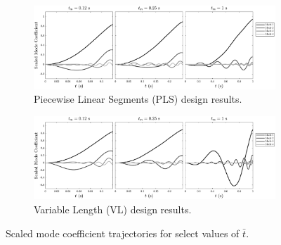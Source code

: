 \begin{figure}[t]
    \centering
    \begin{subfigure}[b]{0.98\textwidth}
      \centering
      \includegraphics[width=\columnwidth]{../ch7/figures/ModesPLS}
      \caption{Piecewise Linear Segments (PLS) design results.}\label{fig:ch7:modes_pls}
    \end{subfigure}
    \begin{subfigure}[b]{0.98\textwidth}
      \centering
      \includegraphics[width=\columnwidth]{../ch7/figures/ModesVL}
      \caption{Variable Length (VL) design results.}\label{fig:ch7:modes_vl}
    \end{subfigure}
    \caption{Scaled mode coefficient trajectories for select values of $\bar{t}$.\label{fig:ch7:modes}}
\end{figure}